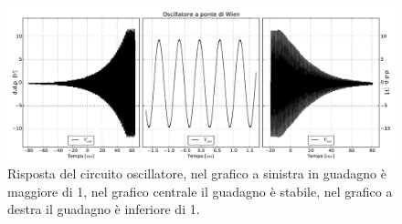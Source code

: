 \begin{figure}[htpc]
\centering
\includegraphics[width=.95\textwidth]{../E08/latex/wien.pdf}
\caption{Risposta del circuito oscillatore, nel grafico a sinistra in guadagno è maggiore di \num{1}, nel grafico centrale il guadagno è stabile, nel grafico a destra il guadagno è inferiore di \num{1}.}
\label{fig8:wien}
\end{figure}
